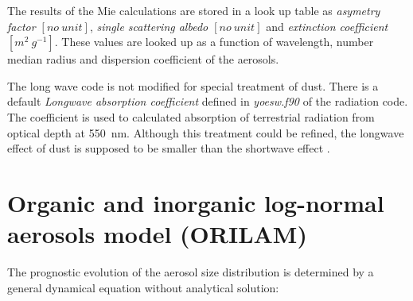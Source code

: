  The results of the Mie calculations are stored in a look up
table as {\it asymetry factor $[no~unit]$}, 
{\it single scattering albedo $[no~unit]$} and 
{\it extinction coefficient $[m^2~g^{-1}]$}.
These values are looked up as a function of wavelength, number median radius 
and dispersion coefficient of the aerosols. 

The long wave code is not modified for special treatment of dust. 
There is a default {\it Longwave absorption coefficient} defined in 
{\it yoesw.f90} of the radiation code. The coefficient is used
to calculated absorption of terrestrial radiation from optical depth at 
550~nm. Although this treatment could be refined, the longwave effect of 
dust is supposed to be smaller than the shortwave effect \citep{Myhre2003}. 


\section{Organic and inorganic log-normal aerosols model (ORILAM)}

The prognostic evolution of the aerosol size distribution is determined by a 
general dynamical
equation \citep{Friedlander1977,Seinfeld1997} without analytical 
solution: 

